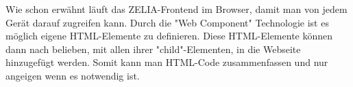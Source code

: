 
Wie schon erwähnt läuft das ZELIA-Frontend im Browser, damit man von jedem Gerät darauf zugreifen kann. Durch die "Web Component" Technologie ist es möglich eigene HTML-Elemente zu definieren. Diese HTML-Elemente können dann nach belieben, mit allen ihrer "child"-Elementen, in die Webseite hinzugefügt werden. Somit kann man HTML-Code zusammenfassen und nur angeigen wenn es notwendig ist.


